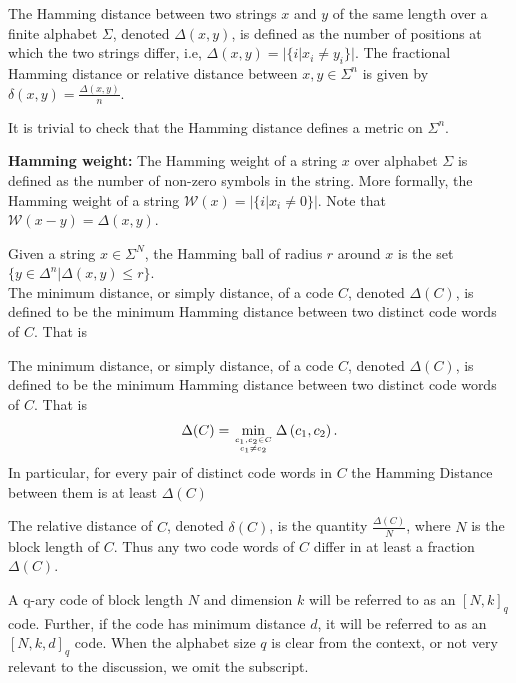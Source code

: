 \begin{definition}
  The Hamming distance between two strings $x$ and $y$ of the same length over a finite alphabet $\Sigma$, denoted $\Delta(x,y)$, is defined as the number of positions at which the two strings differ, i.e, $\Delta(x,y) = |\{i| x_i \neq y_i\}|$. The fractional Hamming distance or relative distance between $x,y\in \Sigma^n$ is given by $\delta(x,y) = \frac{\Delta(x,y)}{n}$.
 \end{definition}
\indent It is trivial to check that the Hamming distance defines a metric on $\Sigma^n$.
\begin{definition}
\textbf{Hamming weight:} The Hamming weight of a string $x$ over alphabet $\Sigma$ is defined as the number of non-zero symbols in the string. More formally, the Hamming weight of a string $\mathcal{W}(x) = |\{i| x_i \neq 0\}|$. Note that $\mathcal{W}(x-y) = \Delta(x,y)$.
\end{definition}
\indent Given a string $x\in\Sigma^{N}$, the Hamming ball of radius $r$ around $x$ is the set $\{y\in\Delta^n | \Delta(x,y)\leq r\}$.\\

\indent The minimum distance, or simply distance, of a code $C$, denoted $\Delta(C)$, is defined to be the minimum Hamming distance between two distinct code words of $C$. That is
\begin{definition}
The minimum distance, or simply distance, of a code $C$, denoted $\Delta(C)$, is defined to be the minimum Hamming distance between two distinct code words of $C$. That is
\begin{equation}
\Delta(C)=\min _{c_{1}, c_{2} \in C \atop c_{1} \neq c_{2}} \Delta\left(c_{1}, c_{2}\right).
\end{equation}
In particular, for every pair of distinct code words in $C$ the Hamming Distance between them is at least $\Delta(C)$
\end{definition}

\indent The relative distance of $C$, denoted $\delta(C)$, is the quantity $\frac{\Delta(C)}{N}$, where $N$ is the block length of $C$. Thus any two code words of $C$ differ in at least a fraction $\Delta(C)$.
\begin{definition}[Notation]
 A q-ary code of block length $N$ and dimension $k$ will be referred to as an $[N,k]_q$ code. Further, if the code has minimum distance $d$, it will be referred to as an $[N,k,d]_q$ code. When the alphabet size $q$ is clear from the context, or not very relevant to the discussion, we omit the subscript.
\end{definition}

